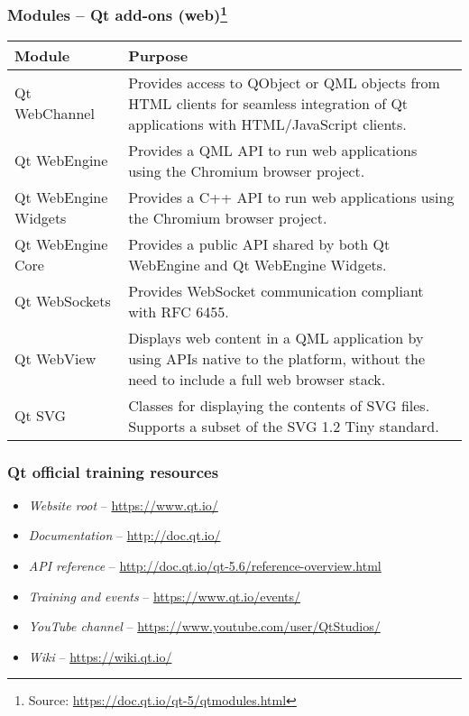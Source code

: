 \begin{frame}
  \frametitle{Modules -- Qt add-ons (web)\footnote
  {\tiny Source: \url{https://doc.qt.io/qt-5/qtmodules.html}}}

  \scriptsize
      \begin{tabular}{|p{}|p{}|}
      \hline
      \textbf{Module} & \textbf{Purpose} \\
      \hline
      Qt WebChannel & Provides access to QObject or QML objects from HTML clients
      for seamless integration of Qt applications with HTML/JavaScript clients.\\
      \hline
      Qt WebEngine & Provides a QML API to run web applications using the Chromium
      browser project.\\
      \hline
      Qt WebEngine Widgets & Provides a C++ API to run web applications using
      the Chromium browser project.\\
      \hline
      Qt WebEngine Core	& Provides a public API shared by both Qt WebEngine and
      Qt WebEngine Widgets.\\
      \hline
      Qt WebSockets & Provides WebSocket communication compliant with RFC 6455.\\
      \hline
      Qt WebView & Displays web content in a QML application by using APIs native
      to the platform, without the need to include a full web browser stack.\\
      \hline
      Qt SVG & Classes for displaying the contents of SVG files. Supports a subset
      of the SVG 1.2 Tiny standard.\\
      \hline
      \end{tabular}
\end{frame}

\begin{frame}
  \frametitle{Qt official training resources}
  \begin{itemize}
    \item {\em Website root} -- \url{https://www.qt.io/}
    \item {\em Documentation} -- \url{http://doc.qt.io/}
    \item {\em API reference} -- \url{http://doc.qt.io/qt-5.6/reference-overview.html}
    \item {\em Training and events} -- \url{https://www.qt.io/events/}
    \item {\em YouTube channel} -- \url{https://www.youtube.com/user/QtStudios/}
    \item {\em Wiki} -- \url{https://wiki.qt.io/}
  \end{itemize}
\end{frame}

